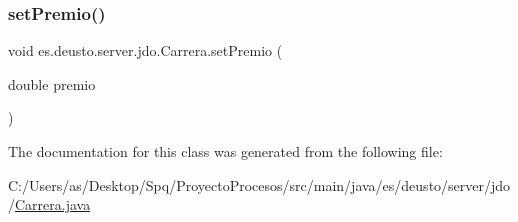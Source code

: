 \mbox{\label{classes_1_1deusto_1_1server_1_1jdo_1_1_carrera_a815210f549d1d724250882806f9b62c4}} 
\subsubsection{\texorpdfstring{setPremio()}{setPremio()}}
{\footnotesize\ttfamily void es.\+deusto.\+server.\+jdo.\+Carrera.\+set\+Premio (\begin{DoxyParamCaption}\item[{double}]{premio }\end{DoxyParamCaption})}



The documentation for this class was generated from the following file\+:\begin{DoxyCompactItemize}
\item 
C\+:/\+Users/as/\+Desktop/\+Spq/\+Proyecto\+Procesos/src/main/java/es/deusto/server/jdo/\mbox{\hyperlink{_carrera_8java}{Carrera.\+java}}\end{DoxyCompactItemize}
